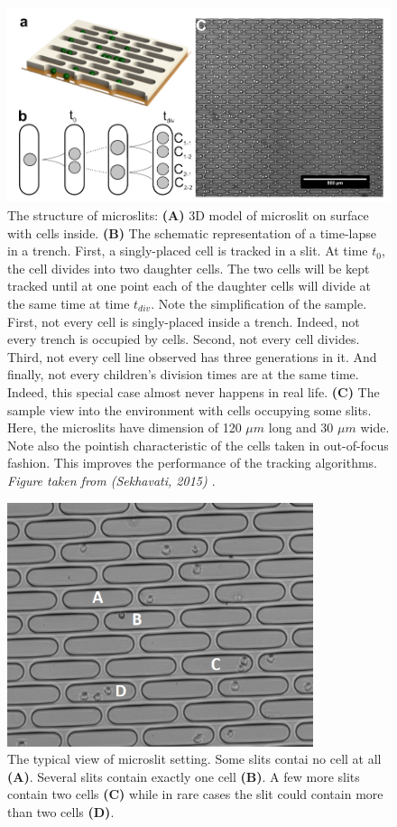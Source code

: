 \documentclass[pdftex,12pt,a4paper]{report}
\begin{document}
\begin{figure}[h]
\centering
\includegraphics[width=1\textwidth]{images/trenches-sekhavati}
\caption{The structure of microslits: \textbf{(A)} 3D model of microslit on surface with cells inside. \textbf{(B)} The schematic representation of a time-lapse in a trench. First, a singly-placed cell is tracked in a slit. At time $t_0$, the cell divides into two daughter cells. The two cells will be kept tracked until at one point each of the daughter cells will divide at the same time at time $t_{div}$. Note the simplification of the sample. First, not every cell is singly-placed inside a trench. Indeed, not every trench is occupied by cells. Second, not every cell divides. Third, not every cell line observed has three generations in it. And finally, not every children's division times are at the same time. Indeed, this special case almost never happens in real life. \textbf{(C)} The sample view into the environment with cells occupying some slits. Here, the microslits have dimension of 120 $\mu m$ long and 30 $\mu m$ wide. Note also the pointish characteristic of the cells taken in out-of-focus fashion. This improves the performance of the tracking algorithms. \textit{Figure taken from (Sekhavati, 2015) \cite{sekhavati2015dynamic}}.}
\label{fig:microslit_design}
\end{figure}

\begin{figure}[h]
\centering
\includegraphics[width=0.8\textwidth]{images/microslit_in}
\caption{The typical view of microslit setting. Some slits contai no cell at all \textbf{(A)}. Several slits contain exactly one cell \textbf{(B)}. A few more slits contain two cells \textbf{(C)} while in rare cases the slit could contain more than two cells \textbf{(D)}.}
\label{fig:microslit_sample}
\end{figure}
\end{document}
